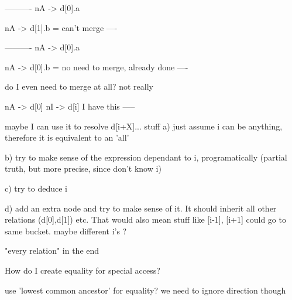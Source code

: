 ----------
nA -> d[0].a

nA -> d[1].b
= can't merge
----

----------
nA -> d[0].a

nA -> d[0].b
= no need to merge, already done
----

do I even need to merge at all?
not really

nA -> d[0]
nI -> d[i]
I have this
-----

maybe I can use it to resolve d[i+X]... stuff
a) just assume i can be anything, therefore it is equivalent to an 'all'

b) try to make sense of the expression dependant to i, programatically (partial truth, but more precise, since don't know i)

c) try to deduce i

d) add an extra node and try to make sense of it. It should inherit all other relations (d[0],d[1]) etc. That would also mean stuff like [i-1], [i+1] could go to same bucket. maybe different i's ?

"every relation" in the end



How do I create equality for special access?




use 'lowest common ancestor' for equality? 
we need to ignore direction though